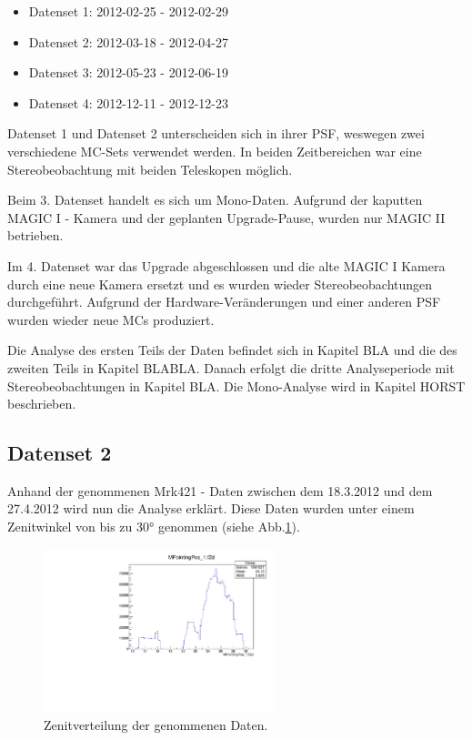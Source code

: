 \begin{itemize}
 \item Datenset 1: 2012-02-25 - 2012-02-29
 \item Datenset 2: 2012-03-18 - 2012-04-27
 \item Datenset 3: 2012-05-23 - 2012-06-19
 \item Datenset 4: 2012-12-11 - 2012-12-23
\end{itemize}

Datenset 1 und Datenset 2 unterscheiden sich in ihrer PSF, weswegen zwei verschiedene MC-Sets verwendet werden.
In beiden Zeitbereichen war eine Stereobeobachtung mit beiden Teleskopen möglich.

Beim 3. Datenset handelt es sich um Mono-Daten. 
Aufgrund der kaputten MAGIC I - Kamera und der geplanten Upgrade-Pause, wurden nur MAGIC II betrieben.

Im 4. Datenset war das Upgrade abgeschlossen und die alte MAGIC I Kamera durch eine neue Kamera ersetzt und es wurden wieder Stereobeobachtungen durchgeführt.
Aufgrund der Hardware-Veränderungen und einer anderen PSF wurden wieder neue MCs produziert.

Die Analyse des ersten Teils der Daten befindet sich in Kapitel BLA und die des zweiten Teils in Kapitel BLABLA.
Danach erfolgt die dritte Analyseperiode mit Stereobeobachtungen in Kapitel BLA.
Die Mono-Analyse wird in Kapitel HORST beschrieben.


\subsection{Datenset 2}
Anhand der genommenen Mrk421 - Daten zwischen dem 18.3.2012 und dem 27.4.2012 wird nun die Analyse erklärt.
Diese Daten wurden unter einem Zenitwinkel von bis zu 30° genommen (siehe Abb.\ref{Datenset2_fZD}).

\begin{figure}
    \centering
    \includegraphics[width=0.6\textwidth]{./Plots/04_MrkAnalyse/Datenset2/Mrk421_Part2.pdf}
    \caption{Zenitverteilung der genommenen Daten.}
    \label{Datenset2_fZD}
\end{figure}


